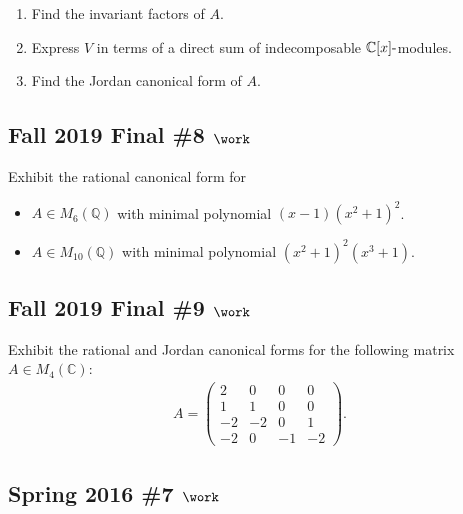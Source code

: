 \begin{enumerate}
\def\labelenumi{\alph{enumi}.}
\item
  Find the invariant factors of \(A\).
\item
  Express \(V\) in terms of a direct sum of indecomposable
  \({\mathbb{C}}[x]{\hbox{-}}\)modules.
\item
  Find the Jordan canonical form of \(A\).
\end{enumerate}

\hypertarget{fall-2019-final-8-work}{%
\subsection{\texorpdfstring{Fall 2019 Final \#8
\(\work\)}{Fall 2019 Final \#8 \textbackslash work}}\label{fall-2019-final-8-work}}

Exhibit the rational canonical form for

\begin{itemize}
\tightlist
\item
  \(A\in M_6({\mathbb{Q}})\) with minimal polynomial
  \((x-1)(x^2 + 1)^2\).
\item
  \(A\in M_{10}({\mathbb{Q}})\) with minimal polynomial
  \((x^2+1)^2(x^3 + 1)\).
\end{itemize}

\hypertarget{fall-2019-final-9-work}{%
\subsection{\texorpdfstring{Fall 2019 Final \#9
\(\work\)}{Fall 2019 Final \#9 \textbackslash work}}\label{fall-2019-final-9-work}}

Exhibit the rational and Jordan canonical forms for the following matrix
\(A\in M_4({\mathbb{C}})\):
\begin{align*}
  A=\left(\begin{array}{cccc}
  2 & 0 & 0 & 0 \\
  1 & 1 & 0 & 0 \\
  -2 & -2 & 0 & 1 \\
  -2 & 0 & -1 & -2
  \end{array}\right)
  .\end{align*}

\hypertarget{spring-2016-7-work}{%
\subsection{\texorpdfstring{Spring 2016 \#7
\(\work\)}{Spring 2016 \#7 \textbackslash work}}\label{spring-2016-7-work}}

